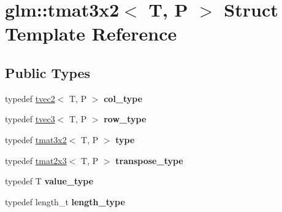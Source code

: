 \hypertarget{structglm_1_1tmat3x2}{}\section{glm\+:\+:tmat3x2$<$ T, P $>$ Struct Template Reference}
\label{structglm_1_1tmat3x2}
\subsection*{Public Types}
\begin{DoxyCompactItemize}
\item 
\mbox{\label{structglm_1_1tmat3x2_a341f5be67463bce97692bc232312b7e8}} 
typedef \hyperlink{structglm_1_1tvec2}{tvec2}$<$ T, P $>$ {\bfseries col\+\_\+type}
\item 
\mbox{\label{structglm_1_1tmat3x2_a54b0650d908b47bb1410661d9b049d90}} 
typedef \hyperlink{structglm_1_1tvec3}{tvec3}$<$ T, P $>$ {\bfseries row\+\_\+type}
\item 
\mbox{\label{structglm_1_1tmat3x2_a170987a0b4f9663c8beeaca40042e0c8}} 
typedef \hyperlink{structglm_1_1tmat3x2}{tmat3x2}$<$ T, P $>$ {\bfseries type}
\item 
\mbox{\label{structglm_1_1tmat3x2_a2ab17a834a083c22dae03db5057bc235}} 
typedef \hyperlink{structglm_1_1tmat2x3}{tmat2x3}$<$ T, P $>$ {\bfseries transpose\+\_\+type}
\item 
\mbox{\label{structglm_1_1tmat3x2_a68ba5fe1734aa7ee61cc637b5de9f696}} 
typedef T {\bfseries value\+\_\+type}
\item 
\mbox{\label{structglm_1_1tmat3x2_a358b949a615ed48c4dc18c53a55358df}} 
typedef length\+\_\+t {\bfseries length\+\_\+type}
\end{DoxyCompactItemize}
